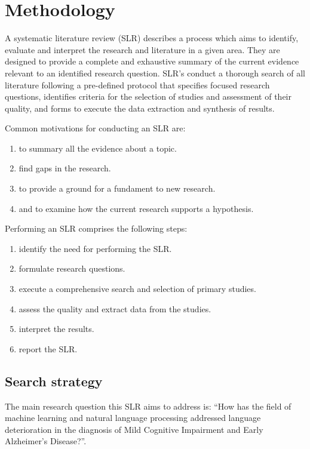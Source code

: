\documentclass[12pt]{article}
\begin{document}
\section{Methodology}\label{methodology}
A systematic literature review (SLR) describes a process which aims to identify, evaluate and interpret the research and literature in a given area. They are designed to provide a complete and exhaustive summary of the current evidence relevant to an identified research question. SLR's conduct a thorough search of all literature following a pre-defined protocol that specifies focused research questions, identifies criteria for the selection of studies and assessment of their quality, and forms to execute the data extraction and synthesis of results. 
\par 
Common motivations for conducting an SLR are: 
\begin{enumerate}
	\item to summary all the evidence about a topic.
	\item find gaps in the research. 
	\item to provide a ground for a fundament to new research.
	\item and to examine how the current research supports a hypothesis. 
\end{enumerate}

Performing an SLR comprises the following steps: 

\begin{enumerate}
	\item identify the need for performing the SLR.
	\item formulate research questions.
	\item execute a comprehensive search and selection of primary studies.
	\item assess the quality and extract data from the studies.
	\item interpret the results.
	\item report the SLR.
\end{enumerate}

\subsection{Search strategy}
The main research question this SLR aims to address is: “How has the field of machine learning and natural language processing addressed language deterioration in the diagnosis of Mild Cognitive Impairment and Early Alzheimer's Disease?”. 
\end{document}
